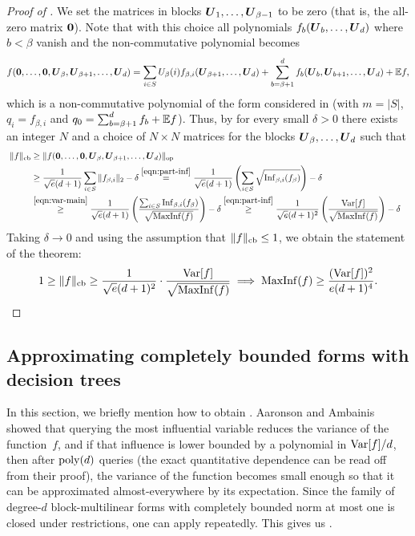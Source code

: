 \begin{proof}[Proof of ]
 We set the matrices in blocks $\boldsymbol{U}_1, \ldots, \boldsymbol{U}_{\beta-1}$ to be zero (that is, the all-zero matrix $\mathbf{0}$). Note that with this choice all polynomials $f_b(\boldsymbol{U}_b, \ldots, \boldsymbol{U}_d)$ where $b < \beta$ vanish and the non-commutative polynomial becomes 
 \[ f(\mathbf{0}, \ldots, \mathbf{0}, \boldsymbol{U}_{\beta}, \boldsymbol{U}_{\beta+1}, \ldots, \boldsymbol{U}_d) = \sum_{i\in S} U_{\beta}(i) f_{\beta,i}(\boldsymbol{U}_{\beta+1}, \ldots, \boldsymbol{U}_d) + \sum_{b=\beta+1}^d f_b(\boldsymbol{U}_b, \boldsymbol{U}_{b+1}, \ldots, \boldsymbol{U}_d) + \mathbb{E} f,\]
  which is a non-commutative polynomial of the form considered in  (with $m = |S|$, $q_i = f_{\beta,i}$ and $q_0 = \sum_{b=\beta+1}^d f_b + \mathbb{E} f$). Thus, by  for every small $\delta>0$ there exists an integer $N$ and a choice of $N \times N$ matrices for the blocks $\boldsymbol{U}_{\beta},\ldots, \boldsymbol{U}_d$ such that 
        \begin{align*}
             \ \cbnorm{f} & \ge \|f(\BZ, \ldots, \BZ, \BU_{\beta}, \BU_{\beta+1}, \ldots, \BU_d)\|_{\op} & \\
             \  & \ge \frac1{\sqrt{e}(d+1)} \sum_{i\in S} \|f_{\beta,i}\|_2 -\delta  \stackrel{\eqref{eqn:part-inf}}{=}  \frac{1}{\sqrt{e}(d+1)} \left(\sum_{i \in S} \sqrt{\Inf_{\beta,i}(f_{\beta})} \right) -\delta & \\
             \ &\stackrel{\eqref{eqn:var-main}}{\ge}  \frac{1}{\sqrt{e}(d+1)} \left( \frac{\sum_{i \in S} \Inf_{\beta,i}(f_{\beta})}{\sqrt{\maxinf(f)}} \right) -\delta  \stackrel{\eqref{eqn:part-inf}}{\ge}  \frac{1}{\sqrt{e}(d+1)^{2}} \left( \frac{\Var[f]}{ \sqrt{\maxinf(f)}} \right) -\delta
        \end{align*}
        Taking $\delta \to 0$ and using the assumption that $\|f\|_{\mathrm{cb}} \le 1$, we obtain the statement of the theorem:
     \[
     1\geq \|f\|_{\mathrm{cb}} \ge \frac{1}{\sqrt{e}(d+1)^{2}} \cdot \frac{\mathrm{Var}[f]}{\sqrt{\mathrm{MaxInf}(f)}} \implies \mathrm{MaxInf}(f) \ge  \frac{(\mathrm{Var}[f])^2}{e(d+1)^4}. \qedhere
     \]
\end{proof}
 

     
     

\subsection{Approximating completely bounded forms with decision trees}



In this section, we briefly mention how to obtain .
Aaronson and Ambainis \cite[Theorem 3.3]{AA14} showed that querying the most influential variable reduces the variance of the function~$f$, and if that influence is lower bounded by a polynomial in $\mathrm{Var}[f]/d$, then after $\mathrm{poly}(d)$ queries (the exact quantitative dependence can be read off from their proof), the variance of the function becomes small enough so that it can be approximated almost-everywhere by its expectation.  Since the family of degree-$d$ block-multilinear forms with completely bounded norm at most one is closed under restrictions, one can apply  repeatedly. This gives us .